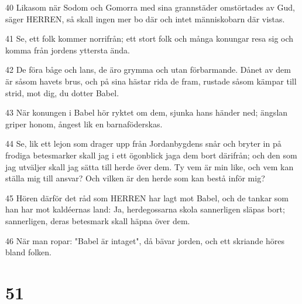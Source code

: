 \par 40 Likasom när Sodom och Gomorra med sina grannstäder omstörtades av Gud, säger HERREN, så skall ingen mer bo där och intet människobarn där vistas.
\par 41 Se, ett folk kommer norrifrån; ett stort folk och många konungar resa sig och komma från jordens yttersta ända.
\par 42 De föra båge och lans, de äro grymma och utan förbarmande. Dånet av dem är såsom havets brus, och på sina hästar rida de fram, rustade såsom kämpar till strid, mot dig, du dotter Babel.
\par 43 När konungen i Babel hör ryktet om dem, sjunka hans händer ned; ängslan griper honom, ångest lik en barnaföderskas.
\par 44 Se, lik ett lejon som drager upp från Jordanbygdens snår och bryter in på frodiga betesmarker skall jag i ett ögonblick jaga dem bort därifrån; och den som jag utväljer skall jag sätta till herde över dem. Ty vem är min like, och vem kan ställa mig till ansvar? Och vilken är den herde som kan bestå inför mig?
\par 45 Hören därför det råd som HERREN har lagt mot Babel, och de tankar som han har mot kaldéernas land: Ja, herdegossarna skola sannerligen släpas bort; sannerligen, deras betesmark skall häpna över dem.
\par 46 När man ropar: "Babel är intaget", då bävar jorden, och ett skriande höres bland folken.

\chapter{51}

